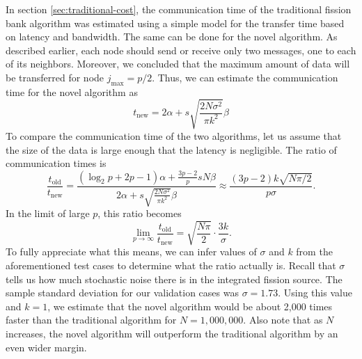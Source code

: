 In section \ref{sec:traditional-cost}, the communication time of the
traditional fission bank algorithm was estimated using a simple model
for the transfer time based on latency and bandwidth. The same can be
done for the novel algorithm. As described earlier, each node should
send or receive only two messages, one to each of its
neighbors. Moreover, we concluded that the maximum amount of data will
be transferred for node $j_{\text{max}} = p/2$. Thus, we can estimate
the communication time for the novel algorithm as
\begin{equation}
  t_{\text{new}} = 2\alpha + s\sqrt{\frac{2N\sigma^2}{\pi k^2}} \beta
\end{equation}
To compare the communication time of the two algorithms, let us assume
that the size of the data is large enough that the latency is
negligible. The ratio of communication times is
\begin{equation}
  \frac{t_{\text{old}}}{t_{\text{new}}} = \frac{\left ( \log_2 p + 2p
    - 1 \right ) \alpha + \frac{3p-2}{p} sN\beta}{2\alpha +
    s\sqrt{\frac{2N\sigma^2}{\pi k^2}} \beta} \approx \frac{ \left (
    3p - 2 \right ) k \sqrt{N\pi/2}}{ p\sigma }.
\end{equation}
In the limit of large $p$, this ratio becomes
\begin{equation}
  \lim_{p\rightarrow\infty} \frac{t_{\text{old}}}{t_{\text{new}}} =
  \sqrt{\frac{N\pi}{2}} \cdot \frac{3k}{\sigma}.
\end{equation}
To fully appreciate what this means, we can infer values of $\sigma$
and $k$ from the aforementioned test cases to determine what the ratio
actually is. Recall that $\sigma$ tells us how much stochastic noise
there is in the integrated fission source. The sample standard
deviation for our validation cases was $\sigma = 1.73$. Using this
value and $k = 1$, we estimate that the novel algorithm would be about
2,000 times faster than the traditional algorithm for $N =
1,000,000$. Also note that as $N$ increases, the novel algorithm will
outperform the traditional algorithm by an even wider margin.

